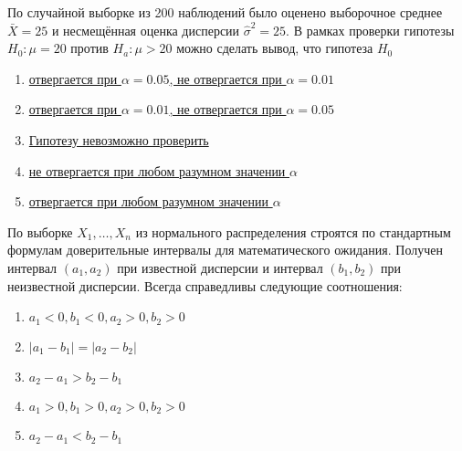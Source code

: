 \documentclass[t]{beamer}
\begin{document}
 \begin{frame} \label{15} 
\begin{block}{15} 

  По случайной выборке из 200 наблюдений было оценено выборочное среднее $\bar{X} = 25$  и несмещённая оценка дисперсии $\hat{\sigma}^2 = 25$. В рамках проверки гипотезы $H_0: \mu = 20$ против $H_a: \mu > 20$ можно сделать вывод, что гипотеза $H_0$
  


 \end{block} 
\begin{enumerate} 
\item[] \hyperlink{15-No}{\beamergotobutton{} отвергается при $\alpha = 0.05$, не отвергается при $\alpha = 0.01$}
\item[] \hyperlink{15-No}{\beamergotobutton{} отвергается при $\alpha = 0.01$, не отвергается при $\alpha = 0.05$}
\item[] \hyperlink{15-No}{\beamergotobutton{} Гипотезу невозможно проверить}
\item[] \hyperlink{15-No}{\beamergotobutton{} не отвергается при любом разумном значении $\alpha$}
\item[] \hyperlink{15-Yes}{\beamergotobutton{} отвергается при любом разумном значении $\alpha$}
\end{enumerate} 
\end{frame} 


 \begin{frame} \label{16} 
\begin{block}{16} 

   По выборке $X_1,\ldots, X_n$ из нормального распределения строятся по стандартным формулам доверительные интервалы для математического ожидания. Получен интервал $(a_1,a_2)$ при известной дисперсии и интервал $(b_1,b_2)$ при неизвестной дисперсии. Всегда справедливы следующие соотношения:
  


 \end{block} 
\begin{enumerate} 
\item[] \hyperlink{16-No}{\beamergotobutton{} $a_1<0,b_1<0,a_2>0,b_2>0$}
\item[] \hyperlink{16-Yes}{\beamergotobutton{} $|a_1-b_1| = |a_2-b_2|$}
\item[] \hyperlink{16-No}{\beamergotobutton{} $a_2 - a_1 > b_2 - b_1$}
\item[] \hyperlink{16-No}{\beamergotobutton{} $a_1>0,b_1>0,a_2>0,b_2>0$}
\item[] \hyperlink{16-No}{\beamergotobutton{} $a_2 - a_1 < b_2 - b_1$}
\end{enumerate} 
\end{frame} 
\end{document}
